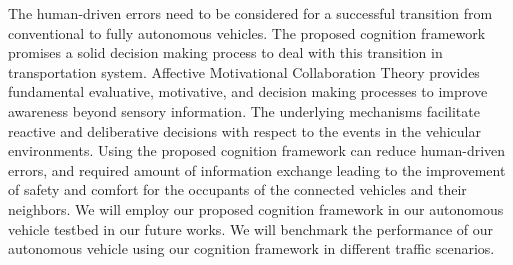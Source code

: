 \documentclass[journal, 11pt]{IEEEtran}
\begin{document}
The human-driven errors need to be considered for a successful transition from
conventional to fully autonomous vehicles. The proposed cognition framework
promises a solid decision making process to deal with this transition in
transportation system. Affective Motivational Collaboration Theory provides
fundamental evaluative, motivative, and decision making processes to improve
awareness beyond sensory information. The underlying mechanisms facilitate
reactive and deliberative decisions with respect to the events in the vehicular
environments. Using the proposed cognition framework can reduce human-driven
errors, and required amount of information exchange leading to the improvement
of safety and comfort for the occupants of the connected vehicles and their
neighbors. We will employ our proposed cognition framework in our autonomous
vehicle testbed in our future works. We will benchmark the performance of our
autonomous vehicle using our cognition framework in different traffic scenarios.



% 
\end{document}
